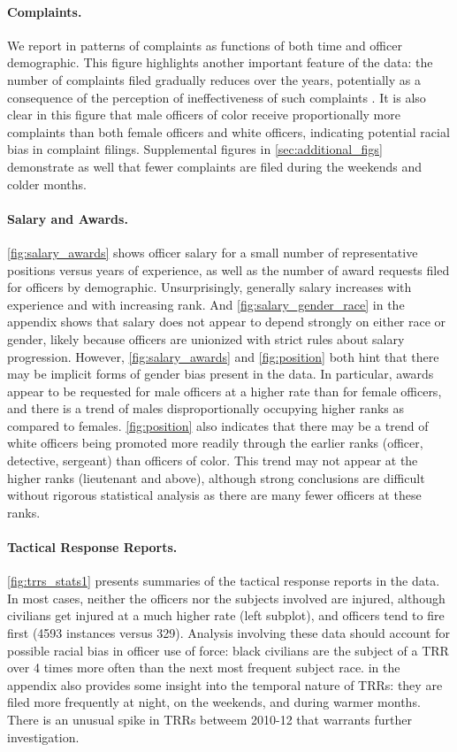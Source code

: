 \paragraph{Complaints.} 
We report in  patterns of complaints as functions of both time
and officer demographic. This figure highlights another important feature of the data: 
the number of complaints filed gradually reduces over the years, potentially as a 
consequence of the perception of ineffectiveness of such complaints \cite{xx}.
It is also clear in this figure that male officers of color receive proportionally more complaints
than both female officers and white officers, indicating potential racial bias in complaint filings.
Supplemental figures in \cref{sec:additional_figs} demonstrate as well that fewer complaints are 
filed during the weekends and colder months.

\paragraph{Salary and Awards.} \cref{fig:salary_awards} shows officer salary for a small number of representative
positions versus years of experience, as well as the number of award requests filed for officers by demographic.
Unsurprisingly, generally salary increases with experience and with increasing rank. 
And \cref{fig:salary_gender_race} in the appendix shows that salary does not appear to depend strongly on either race or gender,
likely because officers are unionized with strict rules about salary progression.
However, \cref{fig:salary_awards} and \cref{fig:position} both hint that there may be implicit forms of gender
bias present in the data. In particular, awards appear to be requested for male officers at a higher rate than for female officers,
and there is a trend of males disproportionally occupying higher ranks as compared to females.
\cref{fig:position} also indicates that there may be a trend of white officers being promoted more readily 
through the earlier ranks (officer, detective, sergeant) than officers of color.
This trend may not appear at the higher ranks (lieutenant and above), although strong conclusions are difficult without 
rigorous statistical analysis as there are many fewer officers at these ranks.

\paragraph{Tactical Response Reports.}
\cref{fig:trrs_stats1} presents summaries of the tactical response reports in the data.
 In most cases, neither the officers nor the
subjects involved are injured, although civilians get injured at a much higher
rate (left subplot), and officers tend to fire first (4593 instances versus 329).
Analysis involving these data should account for possible racial bias in officer use of force: 
black civilians are the subject of a TRR over 4 times more often than the next 
most frequent subject race. 
 in the appendix also provides some 
insight into the temporal nature of TRRs: they are filed more frequently 
at night, on the weekends, and during warmer months. 
There is an unusual spike in TRRs betweem 2010-12 that warrants further investigation.


